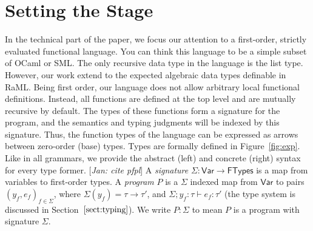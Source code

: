 \documentclass{easychair}
\newcommand{\ms}[1]{\ensuremath{\mathsf{#1}}}
\newcommand{\jan}[1]{{\color{red} [\emph{Jan: #1}]}}
\theoremstyle{definition}
\begin{document}
\section{Setting the Stage}
\label{sect:fop}

In the technical part of the paper, we focus our attention to a first-order, 
strictly evaluated functional language. 
You can think this language to be a simple subset of OCaml or SML. 
The only recursive data type in the language is the list type. 
However, our work extend to the expected algebraic data types definable in RaML.
Being first order, our language does not allow arbitrary local functional definitions. Instead,
all functions are defined at the top level and are mutually recursive by default.
The types of these functions form a signature for the program, and the semantics and typing 
judgments will be indexed by this signature.
Thus, the function types of the language can be expressed 
as arrows between zero-order (base)  types. 
%
Types are formally defined in Figure~\ref{fig:exp}. Like in all
grammars, we provide the abstract (left) and concrete (right) syntax
for every type former.\jan{cite pfpl}
A \emph{signature}  $\Sigma : \ms{Var} \to \ms{FTypes}$ is a map from variables to 
first-order types. 
A \emph{program} $P$ is a $\Sigma$ indexed map from $\ms{Var}$ to pairs 
$(y_f,e_f)_{f \in \Sigma}$, where $\Sigma(y_f) = \tau \to \tau'$, 
and $\Sigma;y_f : \tau \vdash e_f : \tau'$ (the type system is discussed in Section~$\ref{sect:typing}$). 
We write $P : \Sigma$ to mean $P$ is a program with signature $\Sigma$. 
\end{document}
